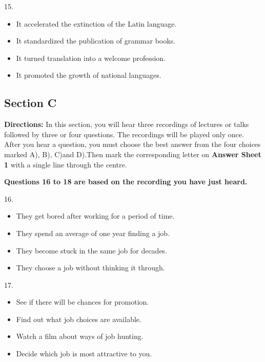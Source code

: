 \documentclass[UTF8,11pt]{ctexart}
\begin{document}
15.


\begin{itemize}[leftmargin=2em,itemsep=.2em,topsep=.4em]\item[A.] It accelerated the extinction of the Latin language.
\item[B.] It standardized the publication of grammar books.
\item[C.] It turned translation into a welcome profession.
\item[D.] It promoted the growth of national languages.
\end{itemize}

\subsection*{\textbf{Section C}}


\textbf{Directions:} In this section, you will hear three recordings of lectures or talks followed by three or four questions. The recordings will be played only once. After you hear a question, you must choose the best answer from the four choices marked A), B), C)and D).Then mark the corresponding letter on\textbf{ Answer Sheet 1} with a single line through the centre.


\textbf{Questions 16 to 18 are based on the recording you have just heard.}


16.


\begin{itemize}[leftmargin=2em,itemsep=.2em,topsep=.4em]\item[A.] They get bored after working for a period of time.
\item[B.] They spend an average of one year finding a job.
\item[C.] They become stuck in the same job for decades.
\item[D.] They choose a job without thinking it through.
\end{itemize}

17.


\begin{itemize}[leftmargin=2em,itemsep=.2em,topsep=.4em]\item[A.] See if there will be chances for promotion.
\item[B.] Find out what job choices are available.
\item[C.] Watch a film about ways of job hunting.
\item[D.] Decide which job is most attractive to you.
\end{itemize}
\end{document}
